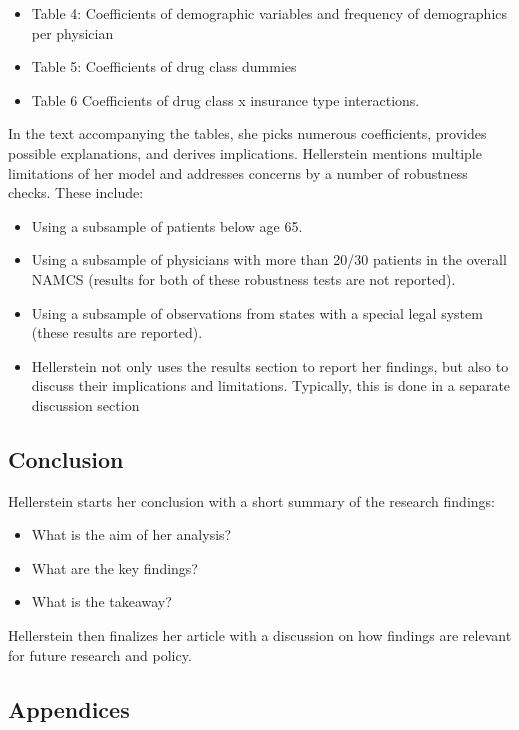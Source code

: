 \documentclass[
]{book}
\providecommand{\tightlist}{%
  \setlength{\itemsep}{0pt}\setlength{\parskip}{0pt}}
\begin{document}
\begin{itemize}
\tightlist
\item
  Table 4: Coefficients of demographic variables and frequency of
  demographics per physician
\item
  Table 5: Coefficients of drug class dummies
\item
  Table 6 Coefficients of drug class x insurance type interactions.
\end{itemize}

In the text accompanying the tables, she picks numerous coefficients,
provides possible explanations, and derives implications. Hellerstein
mentions multiple limitations of her model and addresses concerns by a
number of robustness checks. These include:

\begin{itemize}
\tightlist
\item
  Using a subsample of patients below age 65.
\item
  Using a subsample of physicians with more than 20/30 patients in the
  overall NAMCS (results for both of these robustness tests are not
  reported).
\item
  Using a subsample of observations from states with a special legal
  system (these results are reported).
\item
  Hellerstein not only uses the results section to report her findings,
  but also to discuss their implications and limitations. Typically,
  this is done in a separate discussion section
\end{itemize}

\hypertarget{conclusion}{%
\subsection{Conclusion}\label{conclusion}}

Hellerstein starts her conclusion with a short summary of the research
findings:

\begin{itemize}
\tightlist
\item
  What is the aim of her analysis?
\item
  What are the key findings?
\item
  What is the takeaway?
\end{itemize}

Hellerstein then finalizes her article with a discussion on how findings
are relevant for future research and policy.

\hypertarget{appendices}{%
\subsection{Appendices}\label{appendices}}
\end{document}
